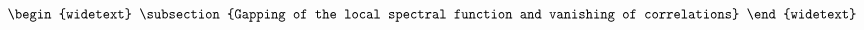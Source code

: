 \documentclass[reprint,hidelinks]{revtex4-2}
\begin{document}
\begin{widetext}
\begin{equation}
\begin{aligned}
\begin{widetext}
\subsection{Gapping of the local spectral function and vanishing of correlations}
%
%
%


\end{widetext}
\end{aligned}
\end{equation}
\end{widetext}
\end{document}
